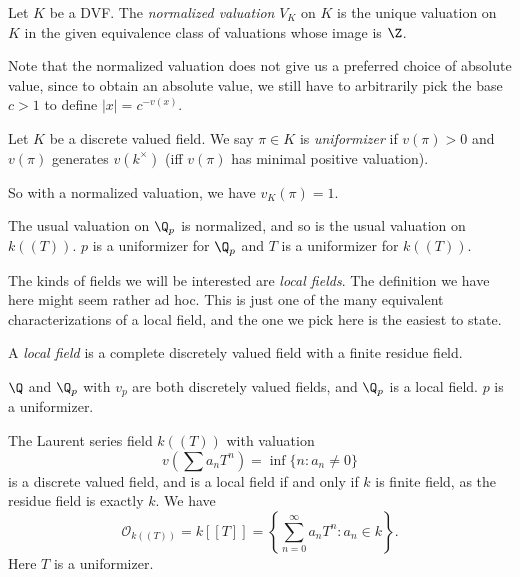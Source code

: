 \documentclass[a4paper]{article}
\begin{document}
\begin{defi}
  Let $K$ be a DVF. The \emph{normalized valuation} $V_K$ on $K$ is the unique valuation on $K$ in the given equivalence class of valuations whose image is $\Z$.
\end{defi}

Note that the normalized valuation does not give us a preferred choice of absolute value, since to obtain an absolute value, we still have to arbitrarily pick the base $c > 1$ to define $|x| = c^{-v(x)}$.

\begin{defi}[Uniformizer]
  Let $K$ be a discrete valued field. We say $\pi \in K$ is \emph{uniformizer} if $v(\pi) > 0$ and $v(\pi)$ generates $v(k^\times)$ (iff $v(\pi)$ has minimal positive valuation).
\end{defi}
So with a normalized valuation, we have $v_K(\pi) = 1$.

\begin{eg}
  The usual valuation on $\Q_p$ is normalized, and so is the usual valuation on $k((T))$. $p$ is a uniformizer for $\Q_p$ and $T$ is a uniformizer for $k((T))$.
\end{eg}

The kinds of fields we will be interested are \emph{local fields}. The definition we have here might seem rather ad hoc. This is just one of the many equivalent characterizations of a local field, and the one we pick here is the easiest to state.
\begin{defi}
  A \emph{local field} is a complete discretely valued field with a finite residue field.
\end{defi}

\begin{eg}
  $\Q$ and $\Q_p$ with $v_p$ are both discretely valued fields, and $\Q_p$ is a local field. $p$ is a uniformizer.
\end{eg}

\begin{eg}
  The Laurent series field $k((T))$ with valuation
  \[
    v\left(\sum a_n T^n\right) = \inf\{n: a_n \not= 0\}
  \]
  is a discrete valued field, and is a local field if and only if $k$ is finite field, as the residue field is exactly $k$. We have
  \[
    \mathcal{O}_{k((T))} = k[[T]] = \left\{\sum_{n = 0}^\infty a_n T^n: a_n \in k\right\}.
  \]
  Here $T$ is a uniformizer.
\end{eg}
\end{document}
